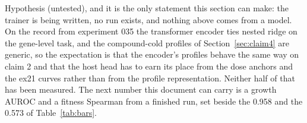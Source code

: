 Hypothesis (untested), and it is the only statement this section can make: the trainer is
being written, no run exists, and nothing above comes from a model. On the record from
experiment 035 the transformer encoder ties nested ridge on the gene-level task, and the
compound-cold profiles of Section~\ref{sec:claim4} are generic, so the expectation is
that the encoder's profiles behave the same way on claim 2 and that the host head has to
earn its place from the dose anchors and the ex21 curves rather than from the profile
representation. Neither half of that has been measured. The next number this document
can carry is a growth AUROC and a fitness Spearman from a finished run, set beside the
0.958 and the 0.573 of Table~\ref{tab:bars}.
